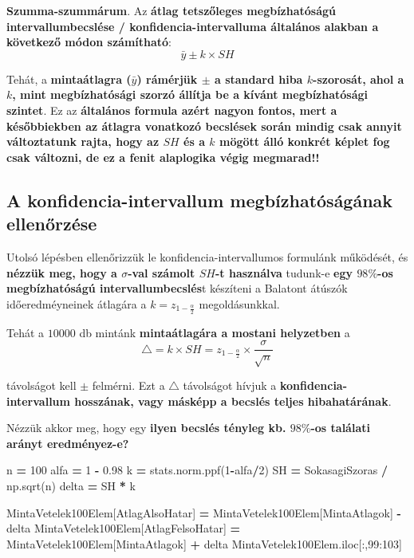\documentclass[
]{book}
\newenvironment{Shaded}{\begin{snugshade}}{\end{snugshade}}
\newcommand{\DecValTok}[1]{\textcolor[rgb]{0.00,0.00,0.81}{#1}}
\newcommand{\FloatTok}[1]{\textcolor[rgb]{0.00,0.00,0.81}{#1}}
\newcommand{\NormalTok}[1]{#1}
\newcommand{\OperatorTok}[1]{\textcolor[rgb]{0.81,0.36,0.00}{\textbf{#1}}}
\newcommand{\StringTok}[1]{\textcolor[rgb]{0.31,0.60,0.02}{#1}}
\begin{document}
\textbf{Szumma-szummárum}. Az \textbf{átlag tetszőleges megbízhatóságú intervallumbecslése / konfidencia-intervalluma általános alakban a következő módon számítható}: \[\bar{y} \pm k \times SH\]

Tehát, a \textbf{mintaátlagra (\(\bar{y}\)) rámérjük \(\pm\) a standard hiba \(k\)-szorosát, ahol a \(k\), mint megbízhatósági szorzó állítja be a kívánt megbízhatósági szintet}.
Ez az \textbf{általános formula azért nagyon fontos, mert a későbbiekben az átlagra vonatkozó becslések során mindig csak annyit változtatunk rajta, hogy az \(SH\) és a \(k\) mögött álló konkrét képlet fog csak változni, de ez a fenit alaplogika végig megmarad!!}

\subsection{A konfidencia-intervallum megbízhatóságának ellenőrzése}\label{a-konfidencia-intervallum-megbuxedzhatuxf3suxe1guxe1nak-ellenux151rzuxe9se}

Utolsó lépésben ellenőrizzük le konfidencia-intervallumos formulánk működését, és \textbf{nézzük meg, hogy a \(\sigma\)-val számolt \(SH\)-t használva} tudunk-e \textbf{egy \(98\%\)-os megbízhatóságú intervallumbecslés}t készíteni a Balatont átúszók időeredméyneinek átlagára a \(k=z_{1-\frac{\alpha}{2}}\) megoldásunkkal.

Tehát a \(10000\) db mintánk \textbf{mintaátlagára a mostani helyzetben} a \[\triangle = k \times SH = z_{1-\frac{\alpha}{2}} \times \frac{\sigma}{\sqrt{n}}\]

távolságot kell \(\pm\) felmérni. Ezt a \(\triangle\) távolságot hívjuk a \textbf{konfidencia-intervallum hosszának, vagy másképp a becslés teljes hibahatárának}.

Nézzük akkor meg, hogy egy \textbf{ilyen becslés tényleg kb. \(98\%\)-os találati arányt eredményez-e?}

\begin{Shaded}
\begin{Highlighting}[]
\NormalTok{n }\OperatorTok{=} \DecValTok{100}
\NormalTok{alfa }\OperatorTok{=} \DecValTok{1} \OperatorTok{{-}} \FloatTok{0.98}
\NormalTok{k }\OperatorTok{=}\NormalTok{ stats.norm.ppf(}\DecValTok{1}\OperatorTok{{-}}\NormalTok{alfa}\OperatorTok{/}\DecValTok{2}\NormalTok{)}
\NormalTok{SH }\OperatorTok{=}\NormalTok{ SokasagiSzoras }\OperatorTok{/}\NormalTok{ np.sqrt(n)}
\NormalTok{delta }\OperatorTok{=}\NormalTok{ SH }\OperatorTok{*}\NormalTok{ k}

\NormalTok{MintaVetelek100Elem[}\StringTok{\textquotesingle{}AtlagAlsoHatar\textquotesingle{}}\NormalTok{] }\OperatorTok{=}\NormalTok{ MintaVetelek100Elem[}\StringTok{\textquotesingle{}MintaAtlagok\textquotesingle{}}\NormalTok{] }\OperatorTok{{-}}\NormalTok{ delta}
\NormalTok{MintaVetelek100Elem[}\StringTok{\textquotesingle{}AtlagFelsoHatar\textquotesingle{}}\NormalTok{] }\OperatorTok{=}\NormalTok{ MintaVetelek100Elem[}\StringTok{\textquotesingle{}MintaAtlagok\textquotesingle{}}\NormalTok{] }\OperatorTok{+}\NormalTok{ delta}
\NormalTok{MintaVetelek100Elem.iloc[:,}\DecValTok{99}\NormalTok{:}\DecValTok{103}\NormalTok{]}
\end{Highlighting}
\end{Shaded}
\end{document}
